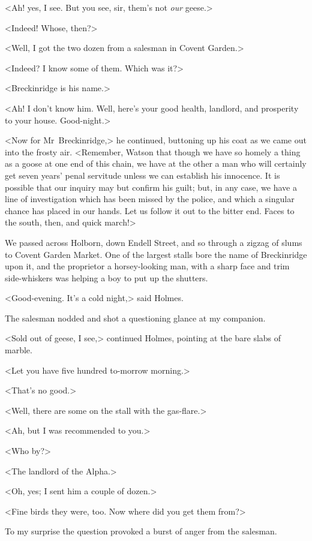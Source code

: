 <Ah! yes, I see. But you see, sir, them's not \textit{our} geese.>

<Indeed! Whose, then?>

<Well, I got the two dozen from a salesman in Covent Garden.>

<Indeed? I know some of them. Which was it?>

<Breckinridge is his name.>

<Ah! I don't know him. Well, here's your good health, landlord, and prosperity to your house. Good-night.>

<Now for Mr~Breckinridge,> he continued, buttoning up his coat as we came out into the frosty air. <Remember, Watson that though we have so homely a thing as a goose at one end of this chain, we have at the other a man who will certainly get seven years' penal servitude unless we can establish his innocence. It is possible that our inquiry may but confirm his guilt; but, in any case, we have a line of investigation which has been missed by the police, and which a singular chance has placed in our hands. Let us follow it out to the bitter end. Faces to the south, then, and quick march!>

We passed across Holborn, down Endell Street, and so through a zigzag of slums to Covent Garden Market. One of the largest stalls bore the name of Breckinridge upon it, and the proprietor a horsey-looking man, with a sharp face and trim side-whiskers was helping a boy to put up the shutters.

<Good-evening. It's a cold night,> said Holmes.

The salesman nodded and shot a questioning glance at my companion.

<Sold out of geese, I see,> continued Holmes, pointing at the bare slabs of marble.

<Let you have five hundred to-morrow morning.>

<That's no good.>

<Well, there are some on the stall with the gas-flare.>

<Ah, but I was recommended to you.>

<Who by?>

<The landlord of the Alpha.>

<Oh, yes; I sent him a couple of dozen.>

<Fine birds they were, too. Now where did you get them from?>

To my surprise the question provoked a burst of anger from the salesman.

